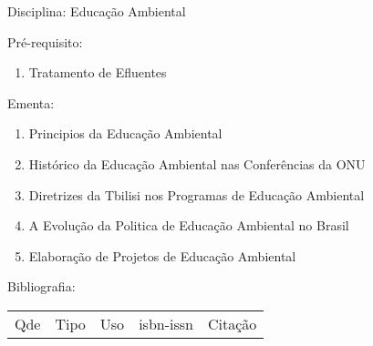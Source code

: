 \documentclass[12pt,a4paper,twoside]{report}
\begin{document}
Disciplina: Educação Ambiental

Pré-requisito:
\begin{enumerate}
\item Tratamento de Efluentes
\end{enumerate}

Ementa:
\begin{enumerate}
\item Principios da Educação Ambiental
\item Histórico da Educação Ambiental nas Conferências da ONU
\item Diretrizes da Tbilisi nos Programas de Educação Ambiental
\item A Evolução da Politica de Educação Ambiental no Brasil
\item Elaboração de Projetos de Educação Ambiental
\end{enumerate}

Bibliografia:
\begin{tabular}{lllll}
Qde & Tipo & Uso & isbn-issn & Citação \\
\end{tabular}
\end{document}
